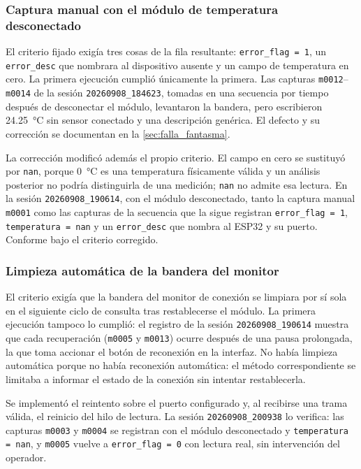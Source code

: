 \subsubsection*{Captura manual con el módulo de temperatura
desconectado}

El criterio fijado exigía tres cosas de la fila resultante:
\texttt{error\_flag = 1}, un \texttt{error\_desc} que nombrara al
dispositivo ausente y un campo de temperatura en cero. La primera
ejecución cumplió únicamente la primera. Las capturas
\texttt{m0012}--\texttt{m0014} de la sesión \texttt{20260908\_184623},
tomadas en una secuencia por tiempo después de desconectar el módulo,
levantaron la bandera, pero escribieron \SI{24.25}{\celsius} sin sensor
conectado y una descripción genérica. El defecto y su corrección se
documentan en la \cref{sec:falla_fantasma}.

La corrección modificó además el propio criterio. El campo en cero se
sustituyó por \texttt{nan}, porque \SI{0}{\celsius} es una temperatura
físicamente válida y un análisis posterior no podría distinguirla de
una medición; \texttt{nan} no admite esa lectura. En la sesión
\texttt{20260908\_190614}, con el módulo desconectado, tanto la
captura manual \texttt{m0001} como las capturas de la secuencia que la
sigue registran \texttt{error\_flag = 1}, \texttt{temperatura = nan} y un
\texttt{error\_desc} que nombra al ESP32 y su puerto. Conforme bajo el
criterio corregido.

\subsubsection*{Limpieza automática de la bandera del monitor}

El criterio exigía que la bandera del monitor de conexión se limpiara
por sí sola en el siguiente ciclo de consulta tras restablecerse el
módulo. La primera ejecución tampoco lo cumplió: el registro de la
sesión \texttt{20260908\_190614} muestra que cada recuperación
(\texttt{m0005} y \texttt{m0013}) ocurre después de una pausa
prolongada, la que toma accionar el botón de reconexión en la
interfaz. No había limpieza automática porque no había reconexión
automática: el método correspondiente se limitaba a informar el estado
de la conexión sin intentar restablecerla.

Se implementó el reintento sobre el puerto configurado y, al recibirse
una trama válida, el reinicio del hilo de lectura. La sesión
\texttt{20260908\_200938} lo verifica: las capturas \texttt{m0003} y
\texttt{m0004} se registran con el módulo desconectado y
\texttt{temperatura = nan}, y \texttt{m0005} vuelve a
\texttt{error\_flag = 0} con lectura real, sin intervención del
operador.

